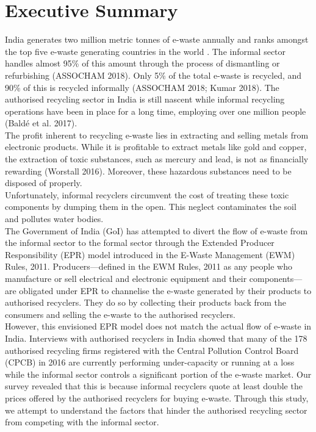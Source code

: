 \documentclass[a4paper, 12pt]{article}
\begin{document}
                    \section*{Executive Summary}
                    India generates two million metric tonnes of e-waste annually and ranks amongst the top five e-waste generating countries in the world \parencite{Shenoy2018}. The informal sector handles almost 95\% of this amount through the process of dismantling or refurbishing (ASSOCHAM 2018). Only 5\% of the total e-waste is recycled, and 90\% of this is recycled informally (ASSOCHAM 2018; Kumar 2018). The authorised recycling sector in India is still nascent while informal recycling operations have been in place for a long time, employing over one million people (Baldé et al. 2017). \\
                    
                    The profit inherent to recycling e-waste lies in extracting and selling metals from electronic products. While it is profitable to extract metals like gold and copper, the extraction of toxic substances, such as mercury and lead, is not as financially rewarding (Worstall 2016). Moreover, these hazardous substances need to be disposed of properly. \\
                    
                    Unfortunately, informal recyclers circumvent the cost of treating these toxic components by dumping them in the open. This neglect contaminates the soil and pollutes water bodies. \\
                    
                    The Government of India (GoI) has attempted to divert the flow of e-waste from the informal sector to the formal sector through the Extended Producer Responsibility (EPR) model introduced in the E-Waste Management (EWM) Rules, 2011. Producers—defined in the EWM Rules, 2011 as any people who manufacture or sell electrical and electronic equipment and their components—are obligated under EPR to channelise the e-waste generated by their products to authorised recyclers. They do so by collecting their products back from the consumers and selling the e-waste to the authorised recyclers. \\
                    
                    However, this envisioned EPR model does not match the actual flow of e-waste in India. Interviews with authorised recyclers in India showed that many of the 178 authorised recycling firms registered with the Central Pollution Control Board (CPCB) in 2016 are currently performing under-capacity or running at a loss while the informal sector controls a significant portion of the e-waste market. Our survey revealed that this is because informal recyclers quote at least double the prices offered by the authorised recyclers for buying e-waste. Through this study, we attempt to understand the factors that hinder the authorised recycling sector from competing with the informal sector. \\
\end{document}
